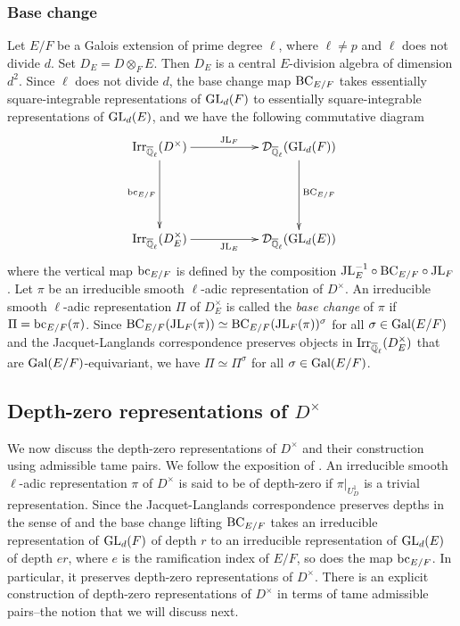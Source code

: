 \documentclass[10pt, reqno]{amsart}
\theoremstyle{plain}
\numberwithin{equation}{section}
\begin{document}
\subsubsection{Base change}
Let $E/F$ be a Galois extension of prime degree $\ell$, where $\ell\ne p$ and $\ell$ does not divide $d$. Set $D_E = D\otimes_F E$. Then $D_E$ is a central $E$-division algebra of dimension $d^2$. Since $\ell$ does not divide $d$, the base change map ${\rm BC}_{E/F}$ takes essentially square-integrable representations of ${\rm GL}_d(F)$ to essentially square-integrable representations of ${\rm GL}_d(E)$, and we have the following commutative diagram 
$$\xymatrix{
	{\rm Irr}_{\overline{\mathbb{Q}}_\ell}(D^\times)\ar[dd]_{{\rm bc}_{E/F}}  \ar[rr]^{{\rm JL}_F}  &&  \mathcal{D}_{\overline{\mathbb{Q}}_\ell}({\rm GL}_d(F)) \ar[dd]^{{{\rm BC}_{E/F}}} \\\\
	{\rm Irr}_{\overline{\mathbb{Q}}_\ell}(D_E^\times) \ar[rr]_{{\rm JL}_E} &&  \mathcal{D}_
	{\overline{\mathbb{Q}}_\ell}({\rm GL}_d(E))
}$$
where the vertical map ${\rm bc}_{E/F}$ is defined by the composition ${\rm JL}_E^{-1}\circ {\rm BC}_{E/F}\circ {\rm JL}_F$. Let $\pi$ be an irreducible smooth $\ell$-adic representation of $D^\times$. An irreducible smooth $\ell$-adic representation $\Pi$ of $D_E^\times$ is called the {\it base change} of $\pi$ if $\Pi={\rm bc}_{E/F}(\pi)$. Since ${\rm BC}_{E/F}({\rm JL}_F(\pi)) \simeq {\rm BC}_{E/F}({\rm JL}_F(\pi))^\sigma$ for all $\sigma\in {\rm Gal}(E/F)$ and the Jacquet-Langlands correspondence preserves objects in ${\rm Irr}_{\overline{\mathbb{Q}}_\ell}(D_E^\times)$ that are ${\rm Gal}(E/F)$-equivariant, we have $\Pi\simeq \Pi^\sigma$ for all $\sigma\in{\rm Gal}(E/F)$.   
\subsection{Depth-zero representations of $D^\times$}
We now discuss the depth-zero representations of $D^\times$ and their construction using admissible tame pairs. We follow the exposition of \cite{BH_depth_zero}. An irreducible smooth $\ell$-adic representation $\pi$ of $D^\times$ is said to be of depth-zero if $\pi|_{U_D^1}$ is a trivial representation. Since the Jacquet-Langlands correspondence preserves depths in the sense of \cite{Moy_Prasad_depths} and the base change lifting ${\rm BC}_{E/F}$ takes an irreducible representation of ${\rm GL}_d(F)$ of depth $r$ to an irreducible representation of ${\rm GL}_d(E)$ of depth $er$, where $e$ is the ramification index of $E/F$, so does the map ${\rm bc}_{E/F}$. In particular, it preserves depth-zero representations of $D^\times$.
There is an explicit construction of depth-zero representations of $D^\times$ in terms of tame admissible pairs--the notion that we will discuss next.
\end{document}
